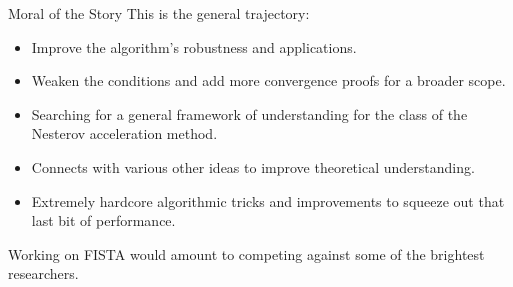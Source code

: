 \documentclass[11pt]{beamer}
\theoremstyle{definition}
\begin{document}
    \begin{frame}{Moral of the Story}
        This is the general trajectory: 
        \begin{itemize}
            \item Improve the algorithm's robustness and applications.  
            \item Weaken the conditions and add more convergence proofs for a broader scope. 
            \item Searching for a general framework of understanding for the class of the Nesterov acceleration method. 
            \item Connects with various other ideas to improve theoretical understanding.
            \item Extremely hardcore algorithmic tricks and improvements to squeeze out that last bit of performance. 
        \end{itemize}
        Working on FISTA would amount to competing against some of the brightest researchers. 
    \end{frame}
    
   
\end{document}
